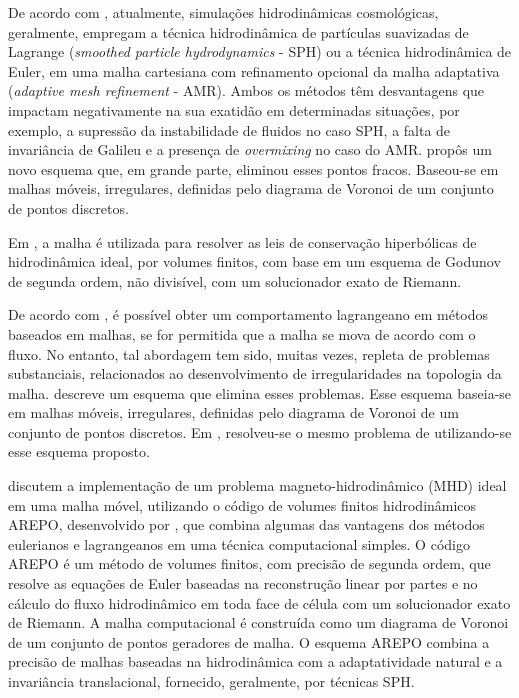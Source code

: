 De acordo com , atualmente, simulações hidrodinâmicas cosmológicas, geralmente, empregam a técnica hidrodinâmica de partículas suavizadas de Lagrange ({\it smoothed particle hydrodynamics} - SPH) ou a técnica hidrodinâmica de Euler, em uma malha cartesiana com refinamento opcional da malha adaptativa ({\it adaptive mesh refinement} - AMR). Ambos os métodos têm desvantagens que impactam negativamente na sua exatidão em determinadas situações, por exemplo, a supressão da instabilidade de fluidos no caso SPH, a falta de invariância de Galileu e a presença de {\it overmixing} no caso do AMR.  propôs um novo esquema que, em grande parte, eliminou esses pontos fracos. Baseou-se em malhas móveis, irregulares, definidas pelo diagrama de Voronoi de um conjunto de pontos discretos. 

Em , a malha é utilizada para resolver as leis de conservação hiperbólicas de hidrodinâmica ideal, por volumes finitos, com base em um esquema de Godunov de segunda ordem, não divisível, com um solucionador exato de Riemann. 

De acordo com , é possível obter um comportamento lagrangeano em métodos baseados em malhas, se for permitida que a malha se mova de acordo com o fluxo. No entanto, tal abordagem tem sido, muitas vezes, repleta de problemas substanciais, relacionados ao desenvolvimento de irregularidades na topologia da malha.  descreve um esquema que elimina esses problemas. Esse esquema baseia-se em malhas móveis, irregulares, definidas pelo diagrama de Voronoi de um conjunto de pontos discretos. Em , resolveu-se o mesmo problema de   utilizando-se esse esquema proposto.

 discutem a implementação de um problema magneto-hidrodinâmico (MHD) ideal em uma malha móvel, utilizando o código de volumes finitos hidrodinâmicos AREPO, desenvolvido por , que combina algumas das vantagens dos métodos eulerianos e lagrangeanos em uma técnica computacional simples. O código AREPO é um método de volumes finitos, com precisão de segunda ordem, que resolve as equações de Euler baseadas na reconstrução linear por partes e no cálculo do fluxo hidrodinâmico em toda face de célula com um solucionador exato de Riemann. A malha computacional é construída como um diagrama de Voronoi de um conjunto de pontos geradores de malha. O esquema AREPO combina a precisão de malhas baseadas na hidrodinâmica com a adaptatividade natural e a invariância translacional, fornecido, geralmente, por técnicas SPH.

